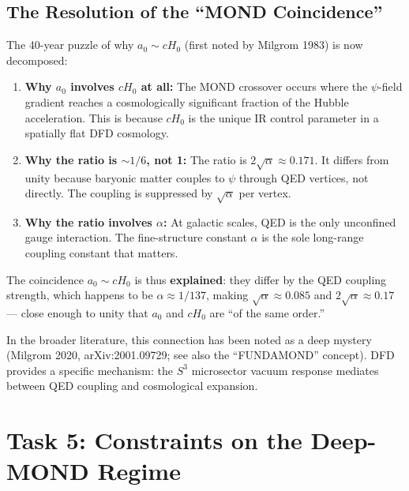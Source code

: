 \documentclass[12pt,a4paper]{article}
\newcommand{\Hzero}{H_0}
\begin{document}
\subsection{The Resolution of the ``MOND Coincidence''}
\label{sec:coincidence-resolved}

The 40-year puzzle of why $a_0 \sim c\Hzero$ (first noted by Milgrom 1983)
is now decomposed:

\begin{enumerate}
\item \textbf{Why $a_0$ involves $c\Hzero$ at all:}
  The MOND crossover occurs where the $\psi$-field gradient reaches a
  cosmologically significant fraction of the Hubble acceleration. This is
  because $c\Hzero$ is the unique IR control parameter in a spatially flat
  DFD cosmology.

\item \textbf{Why the ratio is $\sim 1/6$, not 1:}
  The ratio is $2\sqrt{\alpha} \approx 0.171$. It differs from unity because
  baryonic matter couples to $\psi$ through QED vertices, not directly.
  The coupling is suppressed by $\sqrt{\alpha}$ per vertex.

\item \textbf{Why the ratio involves $\alpha$:}
  At galactic scales, QED is the only unconfined gauge interaction.
  The fine-structure constant $\alpha$ is the sole long-range coupling
  constant that matters.
\end{enumerate}

The coincidence $a_0 \sim c\Hzero$ is thus \textbf{explained}: they differ
by the QED coupling strength, which happens to be $\alpha \approx 1/137$,
making $\sqrt{\alpha} \approx 0.085$ and $2\sqrt{\alpha} \approx 0.17$ ---
close enough to unity that $a_0$ and $c\Hzero$ are ``of the same order.''

In the broader literature, this connection has been noted as a deep mystery
(Milgrom 2020, arXiv:2001.09729; see also the ``FUNDAMOND'' concept).
DFD provides a specific mechanism: the $S^3$ microsector vacuum response
mediates between QED coupling and cosmological expansion.


\section{Task 5: Constraints on the Deep-MOND Regime}
\label{sec:deep-mond}
\end{document}
